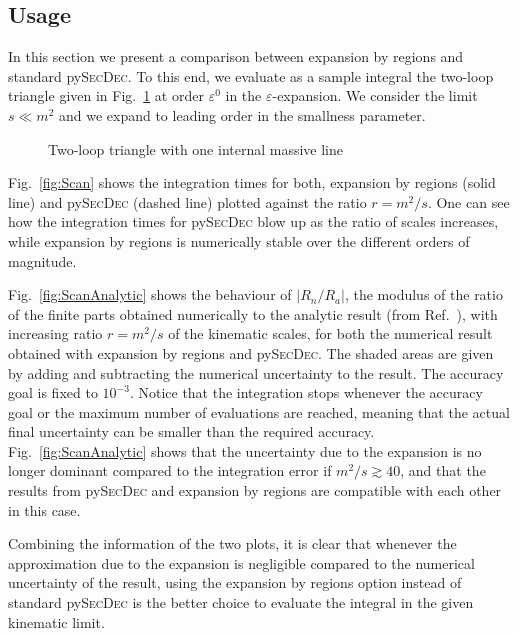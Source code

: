 \documentclass[Physsubmission, Phys]{SciPost}
\newcommand*{\fig}[1]{{}}
\newcommand{\pysecdec}{py{\textsc{SecDec}}}
\newcommand{\eps}{\varepsilon}
\begin{document}
\subsection{Usage}
\label{subsec:12}
In this section we present a comparison between expansion by regions and standard \pysecdec{}. 
To this end, we evaluate as a sample integral the two-loop triangle given in Fig.~\ref{fig:triangle2L} at order $\eps^0$ in the $\eps$-expansion. We consider the limit $s \ll m^{2}$ and we expand to leading order in the smallness parameter.

\begin{figure}[h]
\begin{center}
\fig{triangle2L.tikz} 
    \caption{Two-loop triangle with one internal massive line}
\label{fig:triangle2L}
\end{center}
\end{figure}

\noindent Fig.~\ref{fig:Scan} shows the integration times for both, expansion by regions (solid line) and \pysecdec{} (dashed line) plotted against the ratio $r=m^{2}/s$.
One can see how the integration times for \pysecdec{} blow up as the ratio of scales increases, while expansion by regions is numerically stable over the different orders of magnitude.

Fig.~\ref{fig:ScanAnalytic} shows the behaviour of $|R_{n}/R_{a}|$, the modulus of the ratio of the finite parts obtained numerically to the analytic result (from Ref.~\cite{Fleischer:1998nb}), with increasing ratio $r = m^2/s$ of the kinematic scales, for both 
the numerical result obtained with expansion by regions and \pysecdec{}.
The shaded areas are given by adding and subtracting the numerical uncertainty to the result. The accuracy goal is fixed to $10^{-3}$.
Notice that the integration stops whenever the accuracy goal or the maximum number of evaluations are reached, meaning that the actual final uncertainty can be smaller than the required accuracy. 
Fig.~\ref{fig:ScanAnalytic} shows that the uncertainty due to the expansion is no longer dominant compared to the integration error if $m^2/s \gtrsim 40$, and that the results from \pysecdec{} and expansion by regions are compatible with each other in this case.

Combining the information of the two plots, it is clear that whenever the approximation due to the expansion is negligible compared to the numerical uncertainty of the result, using the expansion by regions option instead of standard \pysecdec{} is the better choice to evaluate the integral in the given kinematic limit. 
\end{document}
